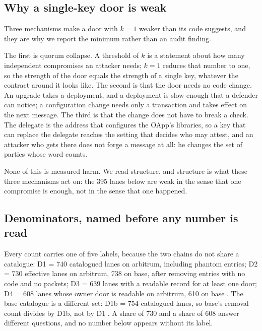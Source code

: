 \documentclass[10pt,a4paper]{article}
\newcommand{\code}[1]{\texttt{\detokenize{#1}}}
\begin{document}
\subsection{Why a single-key door is weak}
Three mechanisms make a door with $k=1$ weaker than its code suggests, and they are why we report the
minimum rather than an audit finding.

The first is quorum collapse. A threshold of $k$ is a statement about how many independent compromises an
attacker needs; $k=1$ reduces that number to one, so the strength of the door equals the strength of a single
key, whatever the contract around it looks like. The second is that the door needs no code change. An
upgrade takes a deployment, and a deployment is slow enough that a defender can notice; a configuration
change needs only a transaction and takes effect on the next message. The third is that the change does not have to break a
check. The delegate is the address that configures the OApp's libraries, so a key that can replace the
delegate reaches the setting that decides who may attest, and an attacker who gets there does not forge a
message at all: he changes the set of parties whose word counts.

None of this is measured harm. We read structure, and structure is what these three mechanisms act on: the
395 lanes below are weak in the sense that one compromise is enough, not in the sense that one happened.
\subsection{Denominators, named before any number is read}
Every count carries one of five labels, because the two chains do not share a catalogue: D1 = 740
catalogued lanes on arbitrum, including phantom entries; D2 = 730
effective lanes on arbitrum, 738 on base, after removing entries with no code and no packets; D3 = 639
lanes with a readable record for at least one door; D4 = 608 lanes whose owner door is readable on
arbitrum, 610 on base \code{[CLAIMS:A0]}. The base catalogue is a different set: D1b = 754 catalogued lanes, so
base's removal count divides by D1b, not by D1 \code{[BASE-LANES:3]}. A share of 730 and a share of 608 answer different questions,
and no number below appears without its label.
\end{document}
